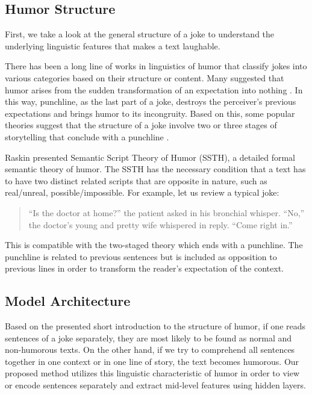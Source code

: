 \documentclass{article}
\begin{document}
\subsection{Humor Structure}
First, we take a look at the general structure of a joke to understand the underlying linguistic features that makes a text laughable. 

There has been a long line of works in linguistics of humor that classify jokes into various categories based on their structure or content. Many suggested that humor arises from the sudden transformation of an expectation into nothing \cite{kant1913kritik}. In this way, punchline, as the last part of a joke, destroys the perceiver's previous expectations and brings humor to its incongruity. Based on this, some popular theories suggest that the structure of a joke involve two or three stages of storytelling that conclude with a punchline \cite{eysenck1942appreciation, suls1972two}. 

Raskin \cite{raskin2012semantic} presented Semantic Script Theory of Humor (SSTH), a detailed formal semantic theory of humor. The SSTH has the necessary condition that a text has to have two distinct related scripts that are opposite in nature, such as real/unreal, possible/impossible. For example, let us review a typical joke:
    \begin{quote}
        “Is the doctor at home?” the patient asked in his bronchial whisper. “No,” the doctor’s young and pretty wife whispered in reply. “Come right in.” \cite{raskin2012semantic}
    \end{quote}

This is compatible with the two-staged theory which ends with a punchline. The punchline is related to previous sentences but is included as opposition to previous lines in order to transform the reader's expectation of the context.

\subsection{Model Architecture}
Based on the presented short introduction to the structure of humor, if one reads sentences of a joke separately, they are most likely to be found as normal and non-humorous texts. On the other hand, if we try to comprehend all sentences together in one context or in one line of story, the text becomes humorous. Our proposed method utilizes this linguistic characteristic of humor in order to view or encode sentences separately and extract mid-level features using hidden layers.
\end{document}
